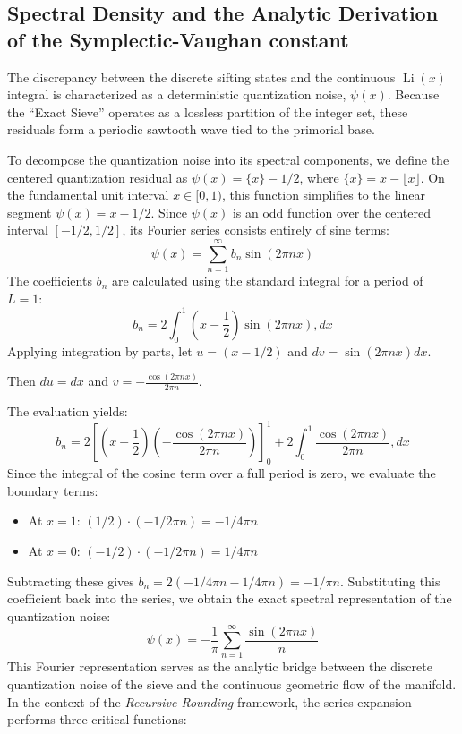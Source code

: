 \documentclass[sn-mathphys-num, pdflatex]{sn-jnl}
\begin{document}
\subsection{Spectral Density and the Analytic Derivation of the Symplectic-Vaughan constant}
\label{sec:Spectral-Density}
The discrepancy between the discrete sifting states and the continuous $\operatorname{Li}(x)$ integral is characterized as a deterministic quantization noise, $\psi(x)$. Because the ``Exact Sieve'' operates as a lossless partition of the integer set, these residuals form a periodic sawtooth wave tied to the primorial base. 

To decompose the quantization noise into its spectral components, we define the centered quantization residual as $\psi(x) = \{x\} - 1/2$, 
where $\{x\} = x - \lfloor x \rfloor$. 
On the fundamental unit interval $x \in [0, 1)$, 
this function simplifies to the linear segment $\psi(x) = x - 1/2$. 
Since $\psi(x)$ is an odd function over the centered interval $[-1/2, 1/2]$, 
its Fourier series consists entirely of sine terms:
\begin{equation}
\psi(x) = \sum_{n=1}^{\infty} b_n \sin(2\pi nx)
\label{Fsine}
\end{equation}
The coefficients $b_n$ are calculated using the standard integral for a period of $L=1$:
\begin{equation}
b_n = 2 \int_{0}^{1} \left( x - \frac{1}{2} \right) \sin(2\pi nx) , dx
\end{equation}
Applying integration by parts, 
let $u = (x - 1/2)$ and $dv = \sin(2\pi nx)dx$.

Then $du = dx$ and $v = -\frac{\cos(2\pi nx)}{2\pi n}$. 

The evaluation yields:
\begin{equation}
b_n = 2 \left[ \left( x - \frac{1}{2} \right) \left( -\frac{\cos(2\pi nx)}{2\pi n} \right) \right]_0^1 + 2 \int_0^1 \frac{\cos(2\pi nx)}{2\pi n} , dx
\end{equation}
Since the integral of the cosine term over a full period is zero, we evaluate the boundary terms:
\begin{itemize}
\item At $x=1$: $(1/2) \cdot (-1/2\pi n) = -1/4\pi n$
\item At $x=0$: $(-1/2) \cdot (-1/2\pi n) = 1/4\pi n$
\end{itemize}
Subtracting these gives 
$b_n = 2(-1/4\pi n - 1/4\pi n) = -1/\pi n$. 
Substituting this coefficient back into the series, we obtain the exact spectral representation of the quantization noise:
\begin{equation}\psi(x) = -\frac{1}{\pi} \sum_{n=1}^{\infty} \frac{\sin(2\pi nx)}{n}
\end{equation}
This Fourier representation serves as the analytic bridge between the discrete quantization noise of the sieve and the continuous geometric flow of the manifold. In the context of the \textit{Recursive Rounding} framework, the series expansion performs three critical functions:
\end{document}
